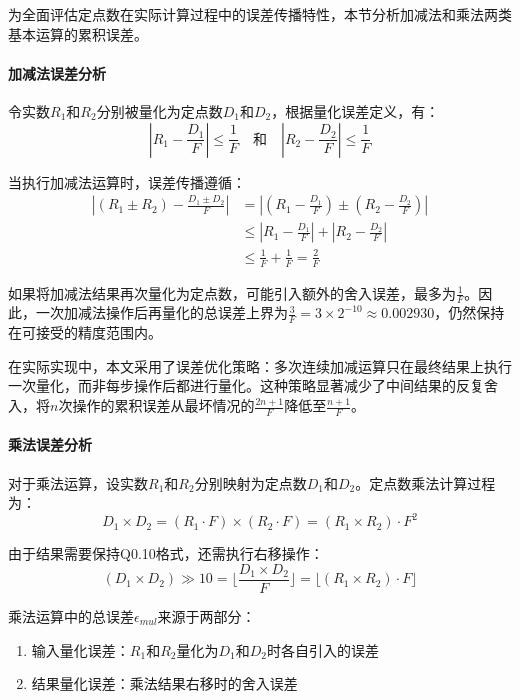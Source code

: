 为全面评估定点数在实际计算过程中的误差传播特性，本节分析加减法和乘法两类基本运算的累积误差。

\paragraph{加减法误差分析}\quad
令实数$R_1$和$R_2$分别被量化为定点数$D_1$和$D_2$，根据量化误差定义，有：
\begin{equation}
|R_1 - \frac{D_1}{F}| \leq \frac{1}{F} \quad \text{和} \quad |R_2 - \frac{D_2}{F}| \leq \frac{1}{F}
\end{equation}

当执行加减法运算时，误差传播遵循：
\begin{equation}
\begin{aligned}
|(R_1 \pm R_2) - \frac{D_1 \pm D_2}{F}| &= |(R_1 - \frac{D_1}{F}) \pm (R_2 - \frac{D_2}{F})| \\
&\leq |R_1 - \frac{D_1}{F}| + |R_2 - \frac{D_2}{F}| \\
&\leq \frac{1}{F} + \frac{1}{F} = \frac{2}{F}
\end{aligned}
\end{equation}

如果将加减法结果再次量化为定点数，可能引入额外的舍入误差，最多为$\frac{1}{F}$。因此，一次加减法操作后再量化的总误差上界为\(\frac{3}{F} = 3 \times 2^{-10} \approx 0.002930\)，仍然保持在可接受的精度范围内。

在实际实现中，本文采用了误差优化策略：多次连续加减运算只在最终结果上执行一次量化，而非每步操作后都进行量化。这种策略显著减少了中间结果的反复舍入，将$n$次操作的累积误差从最坏情况的$\frac{2n+1}{F}$降低至$\frac{n+1}{F}$。

\paragraph{乘法误差分析}\quad
对于乘法运算，设实数$R_1$和$R_2$分别映射为定点数$D_1$和$D_2$。定点数乘法计算过程为：
\begin{equation}
D_1 \times D_2 = (R_1 \cdot F) \times (R_2 \cdot F) = (R_1 \times R_2) \cdot F^2
\end{equation}

由于结果需要保持Q0.10格式，还需执行右移操作：
\begin{equation}
(D_1 \times D_2) \gg 10 = \lfloor \frac{D_1 \times D_2}{F} \rfloor = \lfloor (R_1 \times R_2) \cdot F \rfloor
\end{equation}

乘法运算中的总误差$\epsilon_{mul}$来源于两部分：
\begin{enumerate}
    \item 输入量化误差：$R_1$和$R_2$量化为$D_1$和$D_2$时各自引入的误差
    \item 结果量化误差：乘法结果右移时的舍入误差
\end{enumerate}

